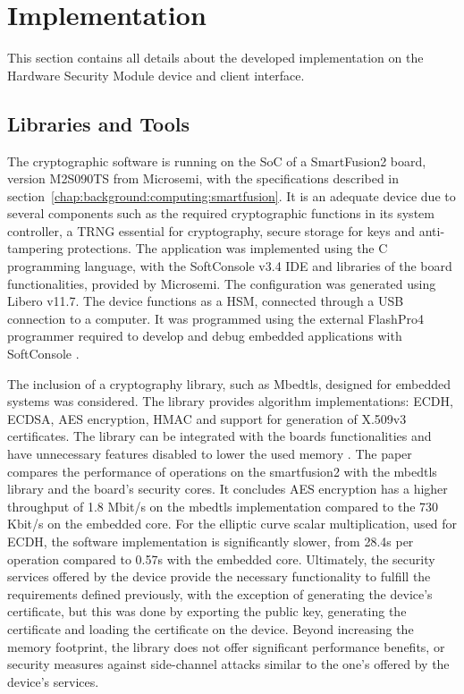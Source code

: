 \section{Implementation}\label{chap:implementation:app}

This section contains all details about the developed implementation on the Hardware Security Module device and client interface.

\subsection{Libraries and Tools}\label{chap:implementation:app:tools}

The cryptographic software is running on the \ac{SoC} of a SmartFusion2 board, version M2S090TS from Microsemi, with the specifications described in section~\ref{chap:background:computing:smartfusion}. It is an adequate device due to several components such as the required cryptographic functions in its system controller, a \ac{TRNG} essential for cryptography, secure storage for keys and anti-tampering protections.
The application was implemented using the C programming language, with the SoftConsole v3.4 \ac{IDE} and libraries of the board functionalities, provided by Microsemi. The configuration was generated using Libero v11.7.
The device functions as a \ac{HSM}, connected through a \ac{USB} connection to a computer. It was programmed using the external FlashPro4 programmer required to develop and debug embedded applications with SoftConsole \cite{smartfusionSecurityPractices}.

The inclusion of a cryptography library, such as Mbedtls, designed for embedded systems was considered. The library provides algorithm implementations: ECDH, ECDSA, AES encryption, HMAC and support for generation of X.509v3 certificates. The library can be integrated with the boards functionalities and have unnecessary features disabled to lower the used memory \cite{parrinha2017flexible}.
The paper compares the performance of operations on the smartfusion2 with the mbedtls library and the board's security cores. It concludes AES encryption has a higher throughput of 1.8 Mbit/s on the mbedtls implementation compared to the 730 Kbit/s on the embedded core. For the elliptic curve scalar multiplication, used for ECDH, the software implementation is significantly slower, from 28.4s per operation compared to 0.57s with the embedded core.
Ultimately, the security services offered by the device provide the necessary functionality to fulfill the requirements defined previously, with the exception of generating the device's certificate, but this was done by exporting the public key, generating the certificate and loading the certificate on the device.
Beyond increasing the memory footprint, the library does not offer significant performance benefits, or security measures against side-channel attacks similar to the one's offered by the device's services.

